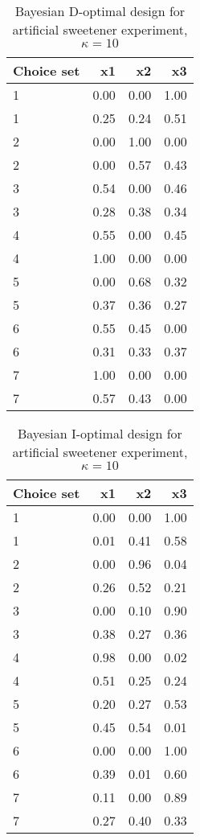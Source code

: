 \begin{table}[ht]
\centering
\begin{tabular}{lrrr}
  \hline
Choice set & x1 & x2 & x3 \\ 
  \hline
1 & 0.00 & 0.00 & 1.00 \\ 
  1 & 0.25 & 0.24 & 0.51 \\ 
  2 & 0.00 & 1.00 & 0.00 \\ 
  2 & 0.00 & 0.57 & 0.43 \\ 
  3 & 0.54 & 0.00 & 0.46 \\ 
  3 & 0.28 & 0.38 & 0.34 \\ 
  4 & 0.55 & 0.00 & 0.45 \\ 
  4 & 1.00 & 0.00 & 0.00 \\ 
  5 & 0.00 & 0.68 & 0.32 \\ 
  5 & 0.37 & 0.36 & 0.27 \\ 
  6 & 0.55 & 0.45 & 0.00 \\ 
  6 & 0.31 & 0.33 & 0.37 \\ 
  7 & 1.00 & 0.00 & 0.00 \\ 
  7 & 0.57 & 0.43 & 0.00 \\ 
   \hline
\end{tabular}
\caption{Bayesian D-optimal design for artificial sweetener experiment, $\kappa = 10$} 
\label{tab:cornell_exp_d_optimal_des_kappa_10}
\end{table}
\begin{table}[ht]
\centering
\begin{tabular}{lrrr}
  \hline
Choice set & x1 & x2 & x3 \\ 
  \hline
1 & 0.00 & 0.00 & 1.00 \\ 
  1 & 0.01 & 0.41 & 0.58 \\ 
  2 & 0.00 & 0.96 & 0.04 \\ 
  2 & 0.26 & 0.52 & 0.21 \\ 
  3 & 0.00 & 0.10 & 0.90 \\ 
  3 & 0.38 & 0.27 & 0.36 \\ 
  4 & 0.98 & 0.00 & 0.02 \\ 
  4 & 0.51 & 0.25 & 0.24 \\ 
  5 & 0.20 & 0.27 & 0.53 \\ 
  5 & 0.45 & 0.54 & 0.01 \\ 
  6 & 0.00 & 0.00 & 1.00 \\ 
  6 & 0.39 & 0.01 & 0.60 \\ 
  7 & 0.11 & 0.00 & 0.89 \\ 
  7 & 0.27 & 0.40 & 0.33 \\ 
   \hline
\end{tabular}
\caption{Bayesian I-optimal design for artificial sweetener experiment, $\kappa = 10$} 
\label{tab:cornell_exp_i_optimal_des_kappa_10}
\end{table}
